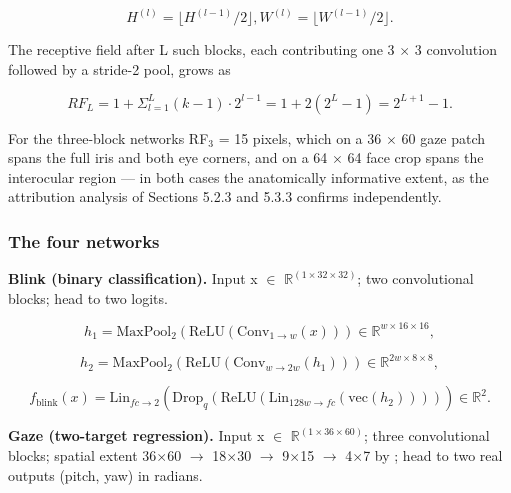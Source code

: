\begin{equation}
\label{eq:68}
H^{(l)} = \lfloor H^{(l-1)} / 2 \rfloor , W^{(l)} = \lfloor W^{(l-1)} / 2 \rfloor .
\end{equation}

The receptive field after L such blocks, each contributing one 3 $\times$ 3 convolution followed by a stride-2 pool, grows as

\begin{equation}
\label{eq:69}
RF_L = 1 + \Sigma _{l=1}^{L} ( k - 1 ) \cdot 2^{l-1} = 1 + 2 ( 2^{L} - 1 ) = 2^{L+1} - 1.
\end{equation}

For the three-block networks RF$_{3}$ = 15 pixels, which on a 36 $\times$ 60 gaze patch spans the full iris and both eye corners, and on a 64 $\times$ 64 face crop spans the interocular region --- in both cases the anatomically informative extent, as the attribution analysis of Sections 5.2.3 and 5.3.3 confirms independently.

\subsubsection{The four networks}

\textbf{Blink (binary classification).} Input x $\in$ $\mathbb{R}^{(1 \times 32 \times 32)}$; two convolutional blocks; head to two logits.

\begin{equation}
\label{eq:70}
h_{1} = \mathrm{MaxPool}_{2}( \mathrm{ReLU}( \mathrm{Conv}_{1 \to w}(x) ) ) \in \mathbb{R}^{w\times 16\times 16},
\end{equation}

\begin{equation}
\label{eq:71}
h_{2} = \mathrm{MaxPool}_{2}( \mathrm{ReLU}( \mathrm{Conv}_{w \to 2w}(h_{1}) ) ) \in \mathbb{R}^{2w\times 8\times 8},
\end{equation}

\begin{equation}
\label{eq:72}
f_{\mathrm{blink}}(x) = \mathrm{Lin}_{fc \to 2}( \mathrm{Drop}_q( \mathrm{ReLU}( \mathrm{Lin}_{128w \to fc}( \mathrm{vec}(h_{2}) ) ) ) ) \in \mathbb{R}^{2}.
\end{equation}

\textbf{Gaze (two-target regression).} Input x $\in$ $\mathbb{R}^{(1 \times 36 \times 60)}$; three convolutional blocks; spatial extent 36$\times$60 $\to$ 18$\times$30 $\to$ 9$\times$15 $\to$ 4$\times$7 by ; head to two real outputs (pitch, yaw) in radians.

